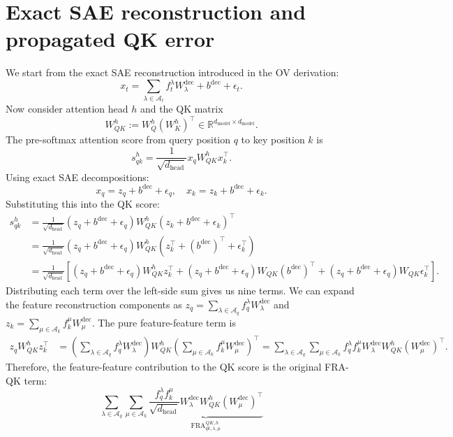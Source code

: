 \documentclass[10pt]{article}
\theoremstyle{definition}
\newcommand{\1}{\mathbf{1}}
\newcommand{\dec}{\mathrm{dec}}
\begin{document}
\section{Exact SAE reconstruction and propagated QK error}
We start from the exact SAE reconstruction introduced in the OV derivation:
\[
x_t = \sum_{\lambda \in \mathcal A_t}f_t^\lambda W_\lambda^\dec + b^\dec + \epsilon_t.
\]
Now consider attention head $h$ and the QK matrix
\begin{equation}
    W_{QK}^h := W_{Q}^h (W_K^h)^\top \in \mathbb{R}^{d_{\text{model}} \times d_{\text{model}}}.
\end{equation}
The pre-softmax attention score from query position $q$ to key position $k$ is
\begin{equation}
    s_{qk}^h = \frac{1}{\sqrt{d_{\text{head}}}} x_q W_{QK}^h x_k^\top.
\end{equation}
Using exact SAE decompositions:
\[
x_q = z_q + b^{\text{dec}} + \epsilon_q,\quad x_k = z_k + b^{\text{dec}} + \epsilon_k.
\]
Substituting this into the QK score:
\begin{align}
    s_{qk}^h &= \frac{1}{\sqrt{d_{\text{head}}}} (z_q + b^\dec + \epsilon_q) W_{QK}^h(z_k + b^\dec + \epsilon_k)^\top \\
    &= \frac{1}{\sqrt{d_{\text{head}}}} (z_q + b^\dec + \epsilon_q) W_{QK}^h(z_k^\top + (b^\dec)^\top + \epsilon_k^\top) \\
    &= \frac{1}{\sqrt{d_{\text{head}}}} \left[ (z_q + b^\dec + \epsilon_q)W_{QK}^h z_k^\top + (z_q + b^\dec + \epsilon_q)W_{QK} (b^\dec)^\top + (z_q + b^\dec + \epsilon_q)W_{QK} \epsilon_k^\top\right].
\end{align}
Distributing each term over the left-side sum gives us nine terms. We can expand the feature reconstruction components as $z_q = \sum_{\lambda \in \mathcal A_q}f_q^\lambda W_\lambda^\dec$ and $z_k = \sum_{\mu \in \mathcal A_k}f_k^\mu W_\mu^\dec$. The pure feature-feature term is
\begin{align}
    z_q W_{QK}^h z_k^\top &= \left( \sum_{\lambda \in \mathcal A_q}f_q^\lambda W_\lambda^\dec\right)W_{QK}^h\left(\sum_{\mu \in \mathcal A_k}f_k^\mu W_\mu^\dec\right)^\top = \sum_{\lambda \in \mathcal A_q}\sum_{\mu \in \mathcal A_k} f_q^\lambda f_k^\mu W_\lambda^\dec W_{QK}^h (W_\mu^\dec)^\top.
\end{align}
Therefore, the feature-feature contribution to the QK score is the original FRA-QK term:
\begin{equation}
    \sum_{\lambda \in \mathcal A_q}\sum_{\mu \in \mathcal A_k} \underbrace{\frac{f_q^\lambda f_k^\mu}{\sqrt{d_{\text{head}}}} W_\lambda^\dec W_{QK}^h (W_\mu^\dec)^\top}_{\mathrm{FRA}_{qk, \lambda, \mu}^{QK, h}}
\end{equation}
\end{document}
